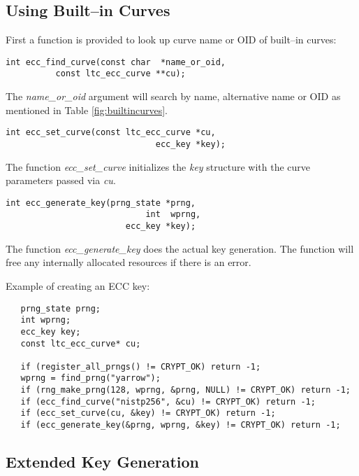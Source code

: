 \documentclass[synpaper]{book}
\begin{document}
\subsection{Using Built--in Curves}

First a function is provided to look up curve name or OID of built--in curves:
\begin{verbatim}
int ecc_find_curve(const char  *name_or_oid,
          const ltc_ecc_curve **cu);
\end{verbatim}

The \textit{name\_or\_oid} argument will search by name, alternative name or OID as mentioned in Table \ref{fig:builtincurves}.

\begin{verbatim}
int ecc_set_curve(const ltc_ecc_curve *cu,
                              ecc_key *key);
\end{verbatim}

The function \textit{ecc\_set\_curve} initializes the \textit{key} structure with the curve parameters passed via \textit{cu}.

\begin{verbatim}
int ecc_generate_key(prng_state *prng,
                            int  wprng,
                        ecc_key *key);
\end{verbatim}

The function \textit{ecc\_generate\_key} does the actual key generation. The function will free any internally
allocated resources if there is an error.

Example of creating an ECC key:
\begin{small}
\begin{verbatim}
   prng_state prng;
   int wprng;
   ecc_key key;
   const ltc_ecc_curve* cu;

   if (register_all_prngs() != CRYPT_OK) return -1;
   wprng = find_prng("yarrow");
   if (rng_make_prng(128, wprng, &prng, NULL) != CRYPT_OK) return -1;
   if (ecc_find_curve("nistp256", &cu) != CRYPT_OK) return -1;
   if (ecc_set_curve(cu, &key) != CRYPT_OK) return -1;
   if (ecc_generate_key(&prng, wprng, &key) != CRYPT_OK) return -1;
\end{verbatim}
\end{small}

\subsection{Extended Key Generation}
\end{document}
